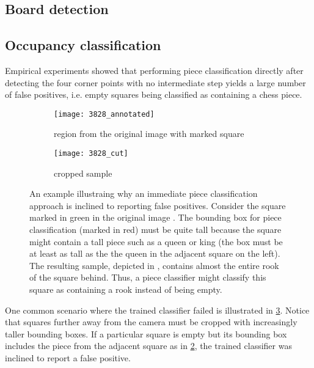 \documentclass[../main.tex]{subfiles}
\begin{document}
\subsection{Board detection}
\subsection{Occupancy classification}
\label{sec:occupancy_classification}

Empirical experiments showed that performing piece classification directly after detecting the four corner points with no intermediate step yields a large number of false positives, i.e. empty squares being classified as containing a chess piece.
\begin{figure}
    \centering
    \begin{subfigure}[b]{0.65\textwidth}
        \centering
        \texttt{[image: 3828\_annotated]}
        \caption{region from the original image with marked square}
        \label{fig:occupancy_classification_fp_original}
    \end{subfigure}
    \hfill
    \begin{subfigure}[b]{0.3\textwidth}
        \centering
        \texttt{[image: 3828\_cut]}
        \caption{cropped sample}
        \label{fig:occupancy_classification_fp_cropped}
    \end{subfigure}
    \caption[An example illustraing why an immediate piece classification approach is inclined to reporting false positives.]{An example illustraing why an immediate piece classification approach is inclined to reporting false positives. Consider the square marked in green in the original image . The bounding box for piece classification (marked in red) must be quite tall because the square might contain a tall piece such as a queen or king (the box must be at least as tall as the the queen in the adjacent square on the left). The resulting sample, depicted in , contains almost the entire rook of the square behind. Thus, a piece classifier might classify this square as containing a rook instead of being empty.}
    \label{fig:occupancy_classification_fp}
\end{figure}
One common scenario where the trained classifier failed is illustrated in \cref{fig:occupancy_classification_fp}.
Notice that squares further away from the camera must be cropped with increasingly taller bounding boxes.
If a particular square is empty but its bounding box includes the piece from the adjacent square as in \cref{fig:occupancy_classification_fp_cropped}, the trained classifier was inclined to report a false positive.
\end{document}
